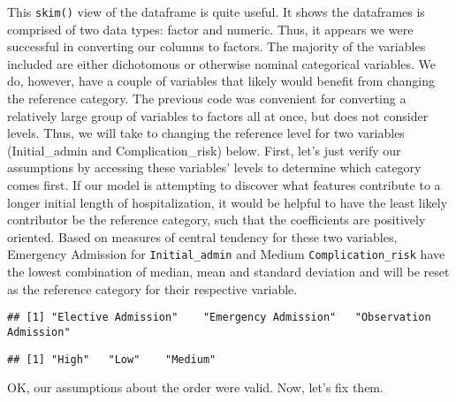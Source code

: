 \documentclass[
]{article}
\newenvironment{Shaded}{\begin{snugshade}}{\end{snugshade}}
\newcommand{\CommentTok}[1]{\textcolor[rgb]{0.56,0.35,0.01}{\textit{#1}}}
\newcommand{\FunctionTok}[1]{\textcolor[rgb]{0.00,0.00,0.00}{#1}}
\newcommand{\NormalTok}[1]{#1}
\newcommand{\SpecialCharTok}[1]{\textcolor[rgb]{0.00,0.00,0.00}{#1}}
\begin{document}
This \texttt{skim()} view of the dataframe is quite useful. It shows the
dataframes is comprised of two data types: factor and numeric. Thus, it
appears we were successful in converting our columns to factors. The
majority of the variables included are either dichotomous or otherwise
nominal categorical variables. We do, however, have a couple of
variables that likely would benefit from changing the reference
category. The previous code was convenient for converting a relatively
large group of variables to factors all at once, but does not consider
levels. Thus, we will take to changing the reference level for two
variables (Initial\_admin and Complication\_risk) below. First, let's
just verify our assumptions by accessing these variables' levels to
determine which category comes first. If our model is attempting to
discover what features contribute to a longer initial length of
hospitalization, it would be helpful to have the least likely
contributor be the reference category, such that the coefficients are
positively oriented. Based on measures of central tendency for these two
variables, Emergency Admission for \texttt{Initial\_admin} and Medium
\texttt{Complication\_risk} have the lowest combination of median, mean
and standard deviation and will be reset as the reference category for
their respective variable.

\begin{Shaded}
\end{Shaded}

\begin{verbatim}
## [1] "Elective Admission"    "Emergency Admission"   "Observation Admission"
\end{verbatim}

\begin{Shaded}
\end{Shaded}

\begin{verbatim}
## [1] "High"   "Low"    "Medium"
\end{verbatim}

OK, our assumptions about the order were valid. Now, let's fix them.
\end{document}
